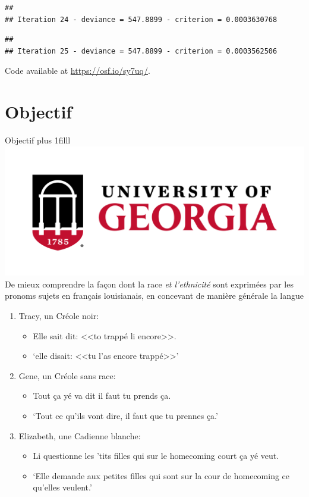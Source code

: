 \documentclass{beamer}\usepackage[]{graphicx}\usepackage[]{xcolor}
\makeatletter
\newenvironment{kframe}{%
 \def\at@end@of@kframe{}%
 \ifinner\ifhmode%
  \def\at@end@of@kframe{\end{minipage}}%
  \begin{minipage}{\columnwidth}%
 \fi\fi%
 \def\FrameCommand##1{\hskip\@totalleftmargin \hskip-\fboxsep
 \colorbox{shadecolor}{##1}\hskip-\fboxsep
     \hskip-\linewidth \hskip-\@totalleftmargin \hskip\columnwidth}%
 \MakeFramed {\advance\hsize-\width
   \@totalleftmargin\z@ \linewidth\hsize
   \@setminipage}}%
 {\par\unskip\endMakeFramed%
 \at@end@of@kframe}
\newenvironment{knitrout}{}{} %
\newcommand{\Logo}{{\hskip0pt plus 1filll \includegraphics[scale=0.028]{uga_logo.png}}}
\newcommand{\gloss}[1]{`#1'}
\makeatother
\begin{document}
\begin{knitrout}
\begin{kframe}
{\ttfamily\noindent\color{warningcolor}{\#\# Warning: Inner iterations did not coverge - nlminb message: false convergence (8)}}\begin{verbatim}
## 
## Iteration 24 - deviance = 547.8899 - criterion = 0.0003630768
\end{verbatim}


{\ttfamily\noindent\color{warningcolor}{\#\# Warning: Inner iterations did not coverge - nlminb message: false convergence (8)}}\begin{verbatim}
## 
## Iteration 25 - deviance = 547.8899 - criterion = 0.0003562506
\end{verbatim}


{\ttfamily\noindent\color{warningcolor}{\#\# Warning: Algorithm did not converge}}\end{kframe}
\end{knitrout}
  \begin{frame}
    \titlepage
    {\scriptsize Code available at \url{https://osf.io/sy7uq/}.}
  \end{frame}

  \section{Objectif}

\begin{frame}[t]{Objectif\Logo}
  De mieux comprendre la façon dont la race \emph{et l'ethnicité} sont exprimées par les pronoms sujets en français louisianais, en concevant \alert{de manière générale} la langue
  \begin{enumerate}
    \item Tracy, un Créole noir:
    \begin{itemize}
      \item Elle sait dit: <<to trappé li encore>>.
      \item[] \gloss{elle disait: <<tu l'as encore trappé>>}
    \end{itemize}
    \item Gene, un Créole sans race:
    \begin{itemize}
      \item Tout ça yé va dit il faut tu prends ça.
      \item[] \gloss{Tout ce qu'ils vont dire, il faut que tu prennes ça.}
    \end{itemize}
    \item Elizabeth, une Cadienne blanche:
    \begin{itemize}
      \item Li questionne les 'tits filles qui sur le homecoming court ça yé veut.
      \item[] \gloss{Elle demande aux petites filles qui sont sur la cour de homecoming ce qu'elles veulent.}
    \end{itemize}
  \end{enumerate}
\end{frame}
  
\end{document}
